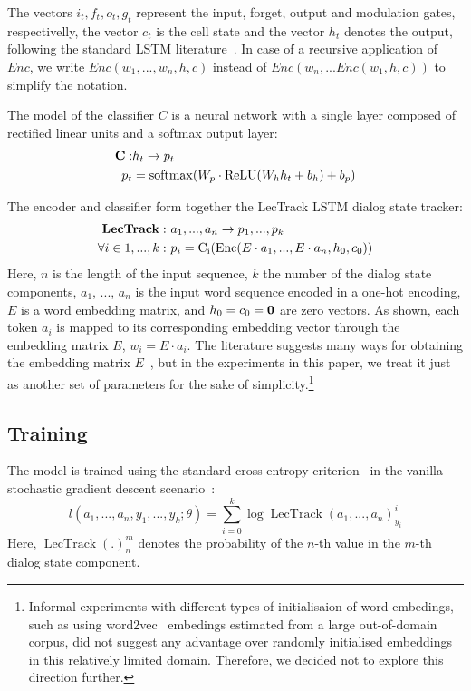\documentclass[11pt,twocolumn]{article}
\begin{document}
The vectors $i_t, f_t, o_t, g_t$ represent the input, forget, output and modulation gates, respectivelly, the vector $c_t$ is the cell state and the vector $h_t$ denotes the output, following the standard LSTM literature~\cite{hochreiter1997long,zaremba2014recurrent}.
In case of a recursive application of $Enc$, we write $Enc(w_1, ..., w_n, h, c)$ instead of $Enc(w_n, ... Enc(w_1, h, c))$ to simplify the notation.

The model of the classifier $C$ is a neural network with a single layer composed of rectified linear units and a softmax output layer:
\begin{align*}
\bf{C}: & h_t \rightarrow p_t \\
p_t &= \operatorname{softmax}(W_p \cdot \operatorname{ReLU}(W_h h_t + b_h) + b_p) \\
\end{align*}

The encoder and classifier form together the LecTrack LSTM dialog state tracker:
\begin{align*}
\bf{LecTrack}: & ~a_1, ..., a_n \rightarrow p_{1}, ..., p_{k} \\
\forall i \in {1, ..., k}: & ~p_i = \operatorname{C_i}(\operatorname{Enc}(E \cdot a_1, ..., E \cdot a_n, h_0, c_0))
\end{align*}
Here, $n$ is the length of the input sequence, $k$ the number of the dialog state components, $a_1$, ..., $a_n$ is the input word sequence encoded in a one-hot encoding, $E$ is a word embedding matrix, and $h_0=c_0=\bf{0}$ are zero vectors. As shown, each token $a_i$ is mapped to its corresponding embedding vector through the embedding matrix $E$, $w_i=E\cdot a_i$. The literature suggests many ways for obtaining the embedding matrix $E$~\cite{mikolov2013efficient,kim2014convolutional,stratosspectral}, but in the experiments in this paper, we treat it just as another set of parameters for the sake of simplicity.\footnote{Informal experiments with different types of initialisaion of word embedings, such as using word2vec~\cite{mikolov2013efficient} embedings estimated from a large out-of-domain corpus, did not suggest any advantage over randomly initialised embeddings in this relatively limited domain. Therefore, we decided not to explore this direction further.}

\subsection{Training}
The model is trained using the standard cross-entropy criterion~\cite{rubinstein2004cross} in the vanilla stochastic gradient descent scenario~\cite{bottou2010large}:
$$ l(a_1, ..., a_n, y_1, ..., y_k; \theta) = \sum_{i=0}^k \operatorname{log} \operatorname{LecTrack}(a_1, ..., a_n)^i_{y_i}$$
Here, $\operatorname{LecTrack}(.)^m_n$ denotes the probability of the $n$-th value in the $m$-th dialog state component.
\end{document}
